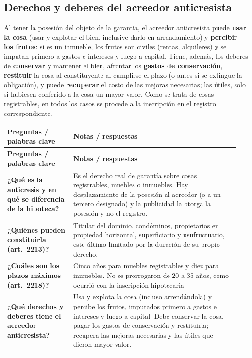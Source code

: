 \documentclass[12pt,oneside]{book}
\makeatletter
\newenvironment{cornell}{%
    \par\vspace{0.5em}
    \noindent
    \begin{longtable}{@{}>{\raggedright\arraybackslash}p{0.27\linewidth}
                         >{\raggedright\arraybackslash}p{0.68\linewidth}@{}}
    \toprule
    \textbf{Preguntas / palabras clave} & \textbf{Notas / respuestas} \\
    \midrule
    \endfirsthead
    \toprule
    \textbf{Preguntas / palabras clave} & \textbf{Notas / respuestas} \\
    \midrule
    \endhead
}{%
    \bottomrule
    \end{longtable}
}
\newcommand{\cornellsummary}[1]{%
    \midrule
    \multicolumn{2}{@{}p{\dimexpr0.95\linewidth+2\tabcolsep\relax}@{}}{%
        \vspace{0.2em}\textbf{Resumen:} #1\vspace{0.2em}} \\
}
\makeatother
\begin{document}
\subsection{Derechos y deberes del acreedor anticresista}

Al tener la posesión del objeto de la garantía, el acreedor anticresista puede \textbf{usar la cosa} (usar y explotar el bien, inclusive darlo en arrendamiento) y \textbf{percibir los frutos}: si es un inmueble, los frutos son civiles (rentas, alquileres) y se imputan primero a gastos e intereses y luego a capital. Tiene, además, los deberes de \textbf{conservar} y mantener el bien, afrontar los \textbf{gastos de conservación}, \textbf{restituir} la cosa al constituyente al cumplirse el plazo (o antes si se extingue la obligación), y puede \textbf{recuperar} el costo de las mejoras necesarias; las útiles, solo si hubiesen conferido a la cosa un mayor valor. Como se trata de cosas registrables, en todos los casos se procede a la inscripción en el registro correspondiente.

\begin{cornell}
\textbf{¿Qué es la anticresis y en qué se diferencia de la hipoteca?} &
Es el derecho real de garantía sobre cosas registrables, muebles o inmuebles. Hay desplazamiento de la posesión al acreedor (o a un tercero designado) y la publicidad la otorga la posesión y no el registro. \\

\textbf{¿Quiénes pueden constituirla (art.~2213)?} &
Titular del dominio, condóminos, propietarios en propiedad horizontal, superficiario y usufructuario, este último limitado por la duración de su propio derecho. \\

\textbf{¿Cuáles son los plazos máximos (art.~2218)?} &
Cinco años para muebles registrables y diez para inmuebles. No se prorrogaron de 20 a 35 años, como ocurrió con la inscripción hipotecaria. \\

\textbf{¿Qué derechos y deberes tiene el acreedor anticresista?} &
Usa y explota la cosa (incluso arrendándola) y percibe los frutos, imputados primero a gastos e intereses y luego a capital. Debe conservar la cosa, pagar los gastos de conservación y restituirla; recupera las mejoras necesarias y las útiles que dieron mayor valor. \\

\cornellsummary{La anticresis recae sobre cosas registrables e implica el desplazamiento posesorio al acreedor, quien puede usar la cosa y percibir sus frutos, con plazos máximos de cinco y diez años según el bien. El acreedor debe conservar la cosa y restituirla.}
\end{cornell}
\end{document}
